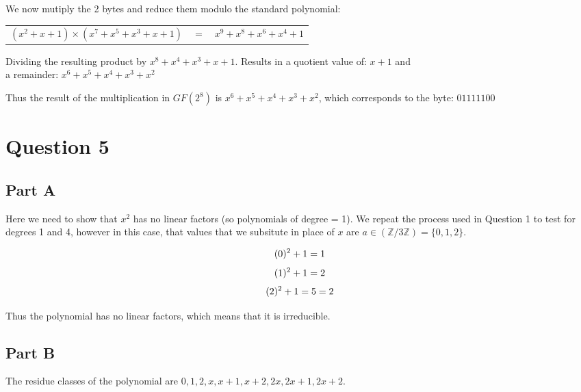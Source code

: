 \documentclass{article}
\numberwithin{equation}{subsection}
\begin{document}
	We now mutiply the 2 bytes and reduce them modulo the standard polynomial:
	\begin{center}
		\begin{tabular}{c c c}
			$(x^2+x+1)\times (x^7+x^5+x^3+x+1)$	&	$=$ & $x^9+x^8+x^6+x^4+1$
		\end{tabular}
	\end{center}

	Dividing the resulting product by $x^8+x^4+x^3+x+1$. Results in a quotient value of: $x+1$ and \\
	a remainder: $x^6+x^5+x^4+x^3+x^2$

	\vspace{10pt}
	Thus the result of the multiplication in $GF(2^8)$ is $x^6+x^5+x^4+x^3+x^2$, which corresponds to the byte:
	$01111100$

	\newpage
	\thispagestyle{fancy}
 	\section*{Question 5}
	\subsection*{Part A}
	Here we need to show that $x^2$ has no linear factors (so polynomials of degree = 1).
	We repeat the process used in Question 1 to test for degrees 1 and 4, however in this case, that values
	that we subsitute in place of $x$ are $a\in (\mathbb{Z}/3\mathbb{Z}) = \{0,1,2\}$.
	
	\vspace{20pt}
		\begin{equation}\notag
			(0)^2+1 =1	
		\end{equation}
		\begin{equation}\notag
			(1)^2 +1 = 2 		\end{equation}
			\begin{equation}\notag
				(2)^2 +1 = 5 = 2 		
			\end{equation}

		Thus the polynomial has no linear factors, which means that it is irreducible.

		\vspace{25pt}
		\subsection*{Part B}
		The residue classes of the polynomial are $0,1,2,x,x+1,x+2,2x,2x+1,2x+2$. 
\end{document}
